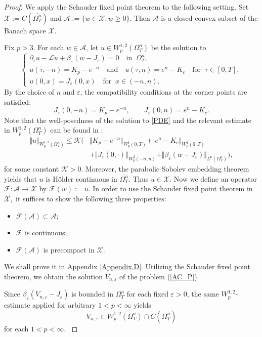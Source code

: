 \documentclass[11pt, a4paper, leqno]{amsart}
\numberwithin{equation}{section}
\theoremstyle{plain}
\theoremstyle{definition}
\theoremstyle{remark}
\def\leq{\leqslant}
\def\geq{\geqslant}
\begin{document}
\begin{proof} 
We apply the Schauder fixed point theorem \cite[280p]{DN01} to the following setting.
Set $\mathcal{X}:=C(\overline{\Omega_T^n})$ and
$\mathcal{A}:=\{w\in \mathcal{X}:w\geq 0 \}$.
Then $\mathcal{A}$ is a closed convex subset of the Banach space $\mathcal{X}.\ $

{
Fix $p>3$.
}
For each $w\in \mathcal{A}$, let $u\in W^{1,2}_p(\Omega_T^n)$
be the solution to
\begin{equation}\label{PDE}
    \begin{cases}
    \partial_{\tau} u-\mathcal{L} u+\beta_\varepsilon(w-J_{\varepsilon})=0
    \quad \text{in }\ \Omega^{n}_T,
    \\
    {
    u(\tau,-n)=K_p-e^{-n}
    \quad \text{and} \quad
    u(\tau,n)=e^{n}-K_c
    \quad \text{for }\ \tau \in [0,T],
    }
    \\
    u(0,x)=J_{\varepsilon}(0,x)
    \quad \text{for }\ x\in (-n,n).
\end{cases}
\end{equation}
{
By the choice of $n$ and $\varepsilon$, the compatibility conditions at
the corner points are satisfied:
\[
    J_\varepsilon(0,-n)=K_p-e^{-n},
    \qquad
    J_\varepsilon(0,n)=e^n-K_c.
\]
}
Note that the well-posedness of the solution to \eqref{PDE}
and the relevant estimate in $W^{1,2}_p(\Omega_T^n)$
can be found in \cite[Theorem 9.1, p.341]{LSU68}:
{
\[
\begin{aligned}
\Vert u \Vert_{W^{1,2}_p(\Omega_T^n)}
\leq \mathcal{K}\Big(
&\Vert K_p-e^{-n}\Vert_{W^1_p(0,T)}
+\Vert e^n-K_c\Vert_{W^1_p(0,T)}
\\
&+\Vert J_{\varepsilon}(0,\cdot)\Vert_{W^{2}_p(-n,n)}
+\Vert \beta_\varepsilon(w-J_{\varepsilon})
\Vert_{L^p(\Omega_T^n)}
\Big),
\end{aligned}
\]
}
for some constant $\mathcal{K}>0$.
Moreover, the parabolic Sobolev embedding theorem
\cite[Chapter II. Lemma 3.3]{LSU68} yields that $u$ is H\"older
continuous in $\overline{\Omega_T^n}$.
Thus $u\in\mathcal{X}.$
Now we define an operator $\mathcal{F}:\mathcal{A}\rightarrow\mathcal{X}$ by
$\mathcal{F}(w):=u$.
In order to use the Schauder fixed point theorem in $\mathcal{X},$
it suffices to show the following three properties:
\begin{itemize}
    \item[(1)] $\mathcal{F}(\mathcal{A})\subset \mathcal{A}$;
    \item[(2)] $\mathcal{F}$ is continuous;
    \item[(3)] $\mathcal{F}(\mathcal{A})$ is precompact in $\mathcal{X}$.
\end{itemize}
We shall prove it in Appendix \ref{Appendix.D}.
Utilizing the Schauder fixed point theorem, we obtain the solution
$V_{n,\varepsilon}$ of the problem (\ref{AC_P}).

{
Since
$\beta_\varepsilon(V_{n,\varepsilon}-J_\varepsilon)$ is bounded in $\Omega_T^n$
for each fixed $\varepsilon>0$, the same $W^{1,2}_p$-estimate applied for arbitrary $1<p<\infty$ yields
\[
    V_{n,\varepsilon}\in
    W^{1,2}_p(\Omega^n_T)\cap C(\overline{\Omega^n_T})
\]
for each $1<p<\infty$.
}
\end{proof}
\end{document}
